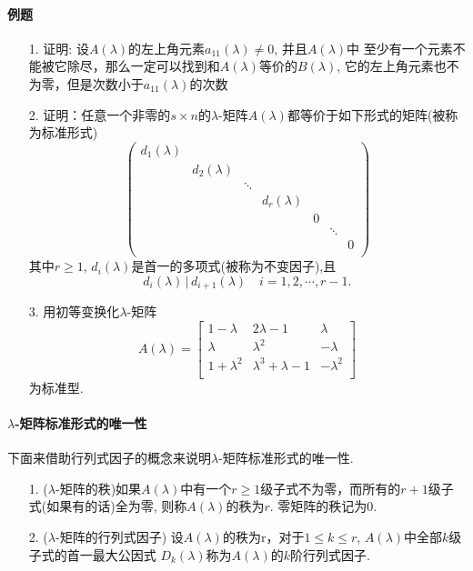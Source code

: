 \paragraph{例题}
\begin{itemize}
  \item[1.] 证明: 设$A(\lambda)$的左上角元素$a_{11}(\lambda) \ne 0$, 并且$A(\lambda)$中
至少有一个元素不能被它除尽，那么一定可以找到和$A(\lambda)$等价的$B(\lambda)$,
它的左上角元素也不为零，但是次数小于$a_{11}(\lambda)$的次数
  \vspace{3cm}
  \item[2.] 证明：任意一个非零的$s\times n$的$\lambda$-矩阵$A(\lambda)$都等价于如下形式的矩阵(被称为标准形式)
\begin{equation}
\nonumber
\begin{pmatrix}
  d_1(\lambda)&&&&&&\\
  &d_2(\lambda)&&&&&\\
  &&\ddots&&&&\\
  &&&d_r(\lambda)&&&\\
  &&&&0&&\\
  &&&&&\ddots&\\
  &&&&&&0\\
\end{pmatrix}
\end{equation}
其中$r\ge 1$, $d_i(\lambda)$是首一的多项式(被称为不变因子),且
$$d_i(\lambda)\,|\,d_{i+1}(\lambda)\quad i=1,2,\cdots, r-1.$$
\vspace{4cm}
\item[3.]用初等变换化$\lambda$-矩阵
\begin{equation}
\nonumber
A(\lambda) =
\begin{bmatrix}
1-\lambda& 2\lambda-1& \lambda\\
\lambda&   \lambda^2&  -\lambda\\
1+\lambda^2& \lambda^3+\lambda-1& -\lambda^2\\
\end{bmatrix}
\end{equation}
为标准型.
\vspace{3cm}
\end{itemize}

\paragraph{$\lambda$-矩阵标准形式的唯一性}
下面来借助行列式因子的概念来说明$\lambda$-矩阵标准形式的唯一性.
\begin{itemize}
  \item[1.] ($\lambda$-矩阵的秩)如果$A(\lambda)$中有一个$r\ge 1$级子式不为零，而所有的$r+1$级子式(如果有的话)全为零,
则称$A(\lambda)$的秩为$r$. 零矩阵的秩记为0.
  \item[2.] ($\lambda$-矩阵的行列式因子) 设$A(\lambda)$的秩为r，对于$1 \le k \le r$, $A(\lambda)$中全部$k$级子式的首一最大公因式
$D_{k}(\lambda)$称为$A(\lambda)$的$k$阶行列式因子.
\end{itemize}

